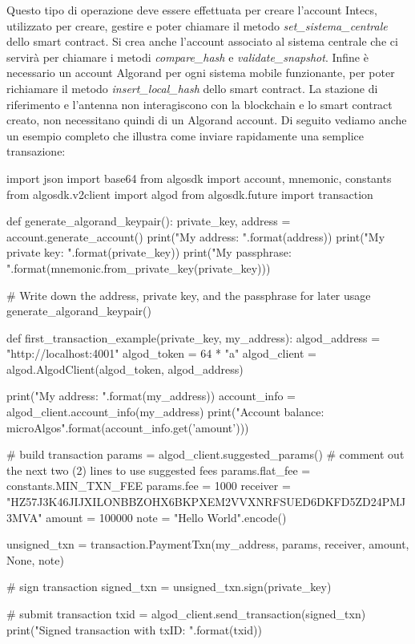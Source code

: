 Questo tipo di operazione deve essere effettuata per creare l'account Intecs, utilizzato per creare, gestire e poter chiamare il metodo \textit{set\_sistema\_centrale} dello smart contract. Si crea anche l'account associato al sistema centrale che ci servirà per chiamare i metodi \textit{compare\_hash} e \textit{validate\_snapshot}. Infine è necessario un account Algorand per ogni sistema mobile funzionante, per poter richiamare il metodo \textit{insert\_local\_hash} dello smart contract. La stazione di riferimento e l'antenna non interagiscono con la blockchain e lo smart contract creato, non necessitano quindi di un Algorand account.
Di seguito vediamo anche un esempio completo che illustra come inviare rapidamente una semplice transazione:
\begin{pythoncode}
import json
import base64
from algosdk import account, mnemonic, constants
from algosdk.v2client import algod
from algosdk.future import transaction


def generate_algorand_keypair():
    private_key, address = account.generate_account()
    print("My address: {}".format(address))
    print("My private key: {}".format(private_key))
    print("My passphrase: {}".format(mnemonic.from_private_key(private_key)))

# Write down the address, private key, and the passphrase for later usage
generate_algorand_keypair()

def first_transaction_example(private_key, my_address):
    algod_address = "http://localhost:4001"
    algod_token = 64 * "a"
    algod_client = algod.AlgodClient(algod_token, algod_address)

    print("My address: {}".format(my_address))
    account_info = algod_client.account_info(my_address)
    print("Account balance: {} microAlgos".format(account_info.get('amount')))

    # build transaction
    params = algod_client.suggested_params()
    # comment out the next two (2) lines to use suggested fees
    params.flat_fee = constants.MIN_TXN_FEE 
    params.fee = 1000
    receiver = "HZ57J3K46JIJXILONBBZOHX6BKPXEM2VVXNRFSUED6DKFD5ZD24PMJ3MVA"
    amount = 100000
    note = "Hello World".encode()

    unsigned_txn = transaction.PaymentTxn(my_address, params, receiver, amount, 
    None, note)

    # sign transaction
    signed_txn = unsigned_txn.sign(private_key)

    # submit transaction
    txid = algod_client.send_transaction(signed_txn)
    print("Signed transaction with txID: {}".format(txid))


\end{pythoncode}
